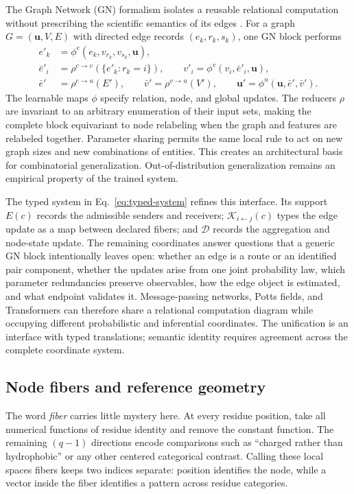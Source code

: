 \documentclass[10pt]{article}
\theoremstyle{definition}
\theoremstyle{remark}
\newcommand{\BookSection}[1]{\subsection{#1}}
\begin{document}
The Graph Network (GN) formalism isolates a reusable relational computation without prescribing
the scientific semantics of its edges \cite{battaglia2018relational}.  For a graph
$G=(\mathbf u,V,E)$ with directed edge records $(e_k,r_k,s_k)$, one GN block performs
\begin{align}
e'_k&=\phi^e(e_k,v_{r_k},v_{s_k},\mathbf u),
\label{eq:gn-edge-update}\\
\bar e'_i&=\rho^{e\to v}\!\left(\{e'_k:r_k=i\}\right),\qquad
v'_i=\phi^v(v_i,\bar e'_i,\mathbf u),
\label{eq:gn-node-update}\\
\bar e'&=\rho^{e\to u}(E'),\qquad
\bar v'=\rho^{v\to u}(V'),\qquad
\mathbf u'=\phi^u(\mathbf u,\bar e',\bar v').
\label{eq:gn-global-update}
\end{align}
The learnable maps $\phi$ specify relation, node, and global updates.  The reducers $\rho$ are
invariant to an arbitrary enumeration of their input sets, making the complete block equivariant
to node relabeling when the graph and features are relabeled together.  Parameter sharing permits
the same local rule to act on new graph sizes and new combinations of entities.  This creates an
architectural basis for combinatorial generalization.  Out-of-distribution generalization remains
an empirical property of the trained system.

The typed system in Eq.~\ref{eq:typed-system} refines this interface.  Its support $E(c)$ records
the admissible senders and receivers; $\mathcal K_{i\leftarrow j}(c)$ types the edge update as a
map between declared fibers; and $\mathcal D$ records the aggregation and node-state update.  The
remaining coordinates answer questions that a generic GN block intentionally leaves open:
whether an edge is a route or an identified pair component, whether the updates arise from one
joint probability law, which parameter redundancies preserve observables, how the edge object is
estimated, and what endpoint validates it.  Message-passing networks, Potts fields, and
Transformers can therefore share a relational computation diagram while occupying different
probabilistic and inferential coordinates.  The unification is an interface with typed
translations; semantic identity requires agreement across the complete coordinate system.

\BookSection{Node fibers and reference geometry}

The word \emph{fiber} carries little mystery here.  At every residue position, take all numerical
functions of residue identity and remove the constant function.  The remaining $(q-1)$ directions
encode comparisons such as ``charged rather than hydrophobic'' or any other centered categorical
contrast.  Calling these local spaces fibers keeps two indices separate: position identifies the
node, while a vector inside the fiber identifies a pattern across residue categories.
\end{document}
